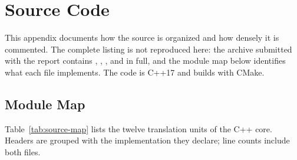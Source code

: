 
\section{Source Code}
\label{app:source}

This appendix documents how the source is organized and how densely it is
commented. The complete listing is not reproduced here: the archive submitted
with the report contains , , , and
 in full, and the module map below identifies what each file
implements. The code is C++17 and builds with CMake.

\subsection{Module Map}

Table~\ref{tab:source-map} lists the twelve translation units of the C++ core.
Headers are grouped with the implementation they declare; line counts include
both files.

